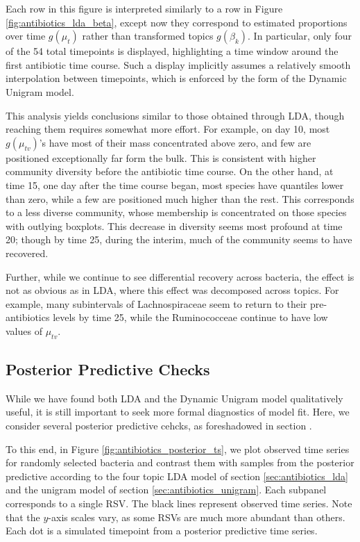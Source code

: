 \documentclass[oupdraft]{bio}
\begin{document}
Each row in this figure is interpreted similarly to a row in Figure
\ref{fig:antibiotics_lda_beta}, except now they correspond to estimated
proportions over time $g\left(\mu_{t}\right)$ rather than transformed topics
$g\left(\beta_{k}\right)$. In particular, only four of the 54 total timepoints
is displayed, highlighting a time window around the first antibiotic time
course. Such a display implicitly assumes a relatively smooth interpolation
between timepoints, which is enforced by the form of the Dynamic Unigram model.

This analysis yields conclusions similar to those obtained through LDA, though
reaching them requires somewhat more effort. For example, on day 10, most
$g\left(\mu_{tv}\right)$'s have most of their mass concentrated above zero, and
few are positioned exceptionally far form the bulk. This is consistent with
higher community diversity before the antibiotic time course. On the other hand,
at time 15, one day after the time course began, most species have quantiles
lower than zero, while a few are positioned much higher than the rest. This
corresponds to a less diverse community, whose membership is concentrated on
those species with outlying boxplots. This decrease in diversity seems most
profound at time 20; though by time 25, during the interim, much of the
community seems to have recovered.

Further, while we continue to see differential recovery across bacteria, the
effect is not as obvious as in LDA, where this effect was decomposed across
topics. For example, many subintervals of Lachnospiraceae seem to return to
their pre-antibiotics levels by time 25, while the Ruminococceae continue to
have low values of $\mu_{tv}$.

\subsection{Posterior Predictive Checks}

While we have found both LDA and the Dynamic Unigram model qualitatively useful,
it is still important to seek more formal diagnostics of model fit. Here, we
consider several posterior predictive cehcks, as foreshadowed in
section \label{sec:ppc_overview}.

To this end, in Figure \ref{fig:antibiotics_posterior_ts}, we plot observed time series for
randomly selected bacteria and contrast them with samples from the posterior
predictive according to the four topic LDA model of
section \ref{sec:antibiotics_lda} and the unigram model of
section \ref{sec:antibiotics_unigram}. Each subpanel corresponds to a single
RSV. The black lines represent observed time series. Note that the $y$-axis scales
vary, as some RSVs are much more abundant than others. Each dot is a simulated
timepoint from a posterior predictive time series.
\end{document}
